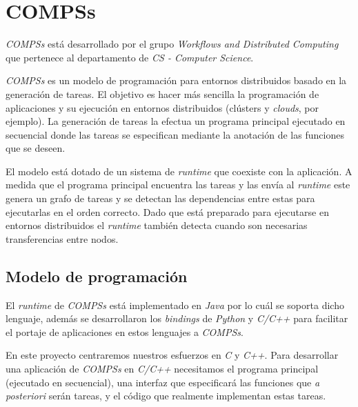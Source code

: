 \section{COMPSs}

\textit{COMPSs} está desarrollado por el grupo \textit{Workflows and Distributed Computing} que pertenece al departamento de \textit{CS - Computer Science}.
\par\bigskip

\textit{COMPSs} es un modelo de programación para entornos distribuidos basado en la generación de tareas. El objetivo es hacer más sencilla la programación de aplicaciones y su ejecución en entornos distribuidos (clústers y \textit{clouds}, por ejemplo). La generación de tareas la efectua un programa principal ejecutado en secuencial donde las tareas se especifican mediante la anotación de las funciones que se deseen.   

\par\bigskip

El modelo está dotado de un sistema de \textit{runtime} que coexiste con la aplicación. A medida que el programa principal encuentra las tareas y las envía al \textit{runtime} este genera un grafo de tareas y se detectan las dependencias entre estas para ejecutarlas en el orden correcto. Dado que está preparado para ejecutarse en entornos distribuidos el \textit{runtime} también detecta cuando son necesarias transferencias entre nodos.

\subsection{Modelo de programación} 
\label{compss_pm}

El \textit{runtime} de \textit{COMPSs} está implementado en \textit{Java} por lo cuál se soporta dicho lenguaje, además se desarrollaron los \textit{bindings} de \textit{Python}\cite{tejedor2017pycompss} y \textit{C/C++} para facilitar el portaje de aplicaciones en estos lenguajes a \textit{COMPSs}. 
\par\bigskip

En este proyecto centraremos nuestros esfuerzos en \textit{C} y \textit{C++}. Para desarrollar una aplicación de \textit{COMPSs} en \textit{C/C++} necesitamos el programa principal (ejecutado en secuencial), una interfaz que especificará las funciones que \textit{a posteriori} serán tareas, y el código que realmente implementan estas tareas. 
\par\bigskip

